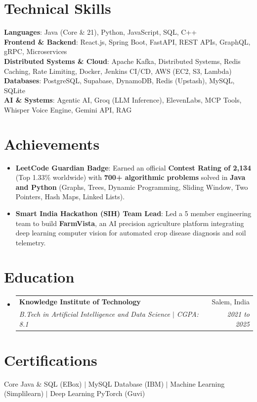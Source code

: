 \documentclass[letterpaper,11pt]{article}
\makeatletter
\newcommand{\resumeItem}[1]{
  \item\small{
    {#1 \vspace{-2pt}}
  }
}
\newcommand{\resumeSubheading}[4]{
  \vspace{-2pt}\item
    \begin{tabular*}{0.97\textwidth}[t]{l@{\extracolsep{\fill}}r}
      \textbf{#1} & #2 \\
      \textit{\small#3} & \textit{\small #4} \\
    \end{tabular*}\vspace{-7pt}
}
\newcommand{\resumeSubHeadingListStart}{\begin{itemize}[leftmargin=0.15in, label={}]}
\newcommand{\resumeSubHeadingListEnd}{\end{itemize}}
\newcommand{\resumeItemListStart}{\begin{itemize}}
\newcommand{\resumeItemListEnd}{\end{itemize}\vspace{-5pt}}
\makeatother
\begin{document}
\section{Technical Skills}
 \begin{itemize}[leftmargin=0.15in, label={}]
    \small{\item{
     \textbf{Languages}{: Java (Core \& 21), Python, JavaScript, SQL, C++} \\
     \textbf{Frontend \& Backend}{: React.js, Spring Boot, FastAPI, REST APIs, GraphQL, gRPC, Microservices} \\
     \textbf{Distributed Systems \& Cloud}{: Apache Kafka, Distributed Systems, Redis Caching, Rate Limiting, Docker, Jenkins CI/CD, AWS (EC2, S3, Lambda)} \\
     \textbf{Databases}{: PostgreSQL, Supabase, DynamoDB, Redis (Upstash), MySQL, SQLite} \\
     \textbf{AI \& Systems}{: Agentic AI, Groq (LLM Inference), ElevenLabs, MCP Tools, Whisper Voice Engine, Gemini API, RAG}
    }}
 \end{itemize}

\section{Achievements}
  \resumeItemListStart
    \resumeItem{\textbf{LeetCode Guardian Badge}: Earned an official \textbf{Contest Rating of 2,134} (Top 1.33\% worldwide) with \textbf{700+ algorithmic problems} solved in \textbf{Java and Python} (Graphs, Trees, Dynamic Programming, Sliding Window, Two Pointers, Hash Maps, Linked Lists).}
    \resumeItem{\textbf{Smart India Hackathon (SIH) Team Lead}: Led a 5 member engineering team to build \textbf{FarmVista}, an AI precision agriculture platform integrating deep learning computer vision for automated crop disease diagnosis and soil telemetry.}
  \resumeItemListEnd

\section{Education}
  \resumeSubHeadingListStart
    \resumeSubheading
      {Knowledge Institute of Technology}{Salem, India}
      {B.Tech in Artificial Intelligence and Data Science $|$ CGPA: 8.1}{2021 to 2025}
  \resumeSubHeadingListEnd

\section{Certifications}
 \begin{itemize}[leftmargin=0.15in, label={}]
    \small{\item{
     Core Java \& SQL (EBox) $|$ MySQL Database (IBM) $|$ Machine Learning (Simplilearn) $|$ Deep Learning PyTorch (Guvi)
    }}
 \end{itemize}

\end{document}
